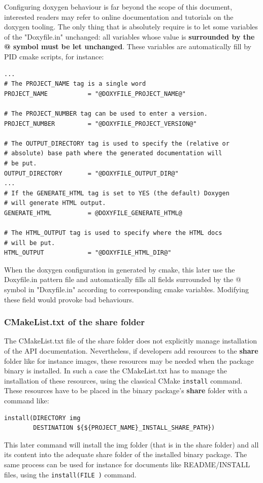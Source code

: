 \documentclass[12pt,a4paper]{article}
\begin{document}
Configuring doxygen behaviour is far beyond the scope of this document, interested readers may refer to online documentation and tutorials on the doxygen tooling. The only thing that is absolutely require is to let some variables of the "Doxyfile.in" unchanged: all variables whose value is \textbf{surrounded by the @ symbol must be let unchanged}. These variables are automatically fill by PID cmake scripts, for instance:
\begin{verbatim}
...
# The PROJECT_NAME tag is a single word 
PROJECT_NAME           = "@DOXYFILE_PROJECT_NAME@"

# The PROJECT_NUMBER tag can be used to enter a version. 
PROJECT_NUMBER         = "@DOXYFILE_PROJECT_VERSION@"

# The OUTPUT_DIRECTORY tag is used to specify the (relative or 
# absolute) base path where the generated documentation will 
# be put. 
OUTPUT_DIRECTORY       = "@DOXYFILE_OUTPUT_DIR@"
...
# If the GENERATE_HTML tag is set to YES (the default) Doxygen 
# will generate HTML output.
GENERATE_HTML          = @DOXYFILE_GENERATE_HTML@

# The HTML_OUTPUT tag is used to specify where the HTML docs 
# will be put. 
HTML_OUTPUT            = "@DOXYFILE_HTML_DIR@"
\end{verbatim}

When the doxygen configuration in generated by cmake, this later use the Doxyfile.in pattern file and automatically fills all fields surrounded by the @ symbol in "Doxyfile.in" according to corresponding cmake variables. Modifying these field would provoke bad behaviours.

\subsubsection{CMakeList.txt of the share folder}
\label{sec:apiCMakeShare}

The CMakeList.txt file of the share folder does not explicitly manage installation of the API documentation. Nevertheless, if developers add resources to the \textbf{share} folder like for instance images, these resources may be needed when the package binary is installed. In such a case the CMakeList.txt has to manage the installation of these resources, using the classical CMake \texttt{install} command. These resources have to be placed in the binary package's \textbf{share} folder with a command like:
\begin{verbatim}
install(DIRECTORY img 
        DESTINATION ${${PROJECT_NAME}_INSTALL_SHARE_PATH})
\end{verbatim}
This later command will install the img folder (that is in the share folder) and all its content into the adequate share folder of the installed binary package. The same process can be used for instance for documents like README/INSTALL files, using the \texttt{install(FILE )} command.
\end{document}
